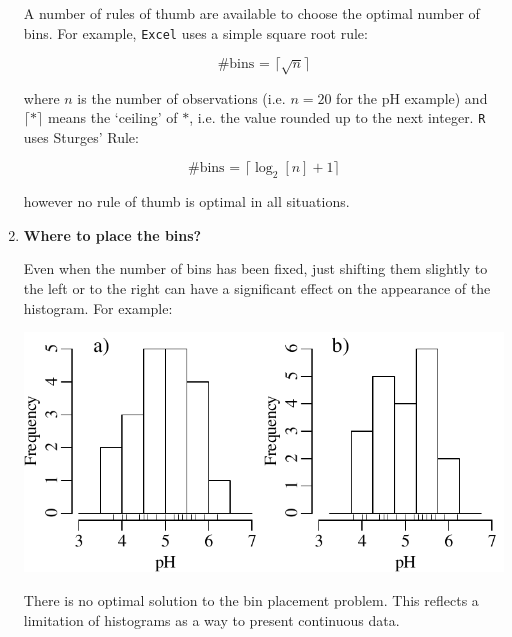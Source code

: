 \begin{enumerate}
  A number of rules of thumb are available to choose the optimal number
  of bins. For example, \texttt{Excel} uses a simple square root rule:

  \begin{equation}
    \mbox{\#{bins} = } \lceil\sqrt{n}\rceil
  \end{equation}

  \noindent where $n$ is the number of observations (i.e. $n = 20$ for
  the pH example) and $\lceil\ast\rceil$ means the `ceiling' of
  $\ast$, i.e. the value rounded up to the next integer. \texttt{R}
  uses Sturges' Rule:

  \begin{equation}
    \mbox{\#{bins} = } \lceil\log_2[n] + 1\rceil
  \end{equation}

  \noindent however no rule of thumb is optimal in all situations.

\item\textbf{Where to place the bins?}

Even when the number of bins has been fixed, just shifting them
slightly to the left or to the right can have a significant effect on
the appearance of the histogram. For example:

\noindent\begin{minipage}[t][][b]{.55\linewidth}
  \includegraphics[width=\textwidth]{../figures/binpos.pdf}\medskip
\end{minipage}
\begin{minipage}[t][][t]{.45\linewidth}
  \label{fig:binpos}
\end{minipage}

There is no optimal solution to the bin placement problem. This
reflects a limitation of histograms as a way to present continuous
data.

\end{enumerate}

